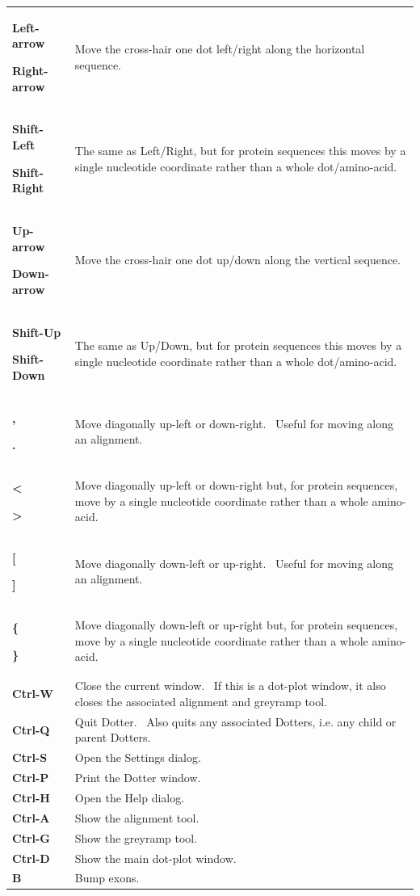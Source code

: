 \documentclass[letterpaper]{article}
\begin{document}
\begin{flushleft}
\tablehead{}
\begin{supertabular}{p{2.222cm}p{11.729cm}}
{\bfseries Left-arrow}

\bfseries Right-arrow &
 Move the cross-hair one dot left/right along
the horizontal sequence.\\
{\bfseries Shift-Left}

\bfseries Shift-Right &
 The same as Left/Right, but for protein
sequences this moves by a single nucleotide coordinate rather than a
whole dot/amino-acid.\\
{\bfseries Up-arrow}

\bfseries Down-arrow &
 Move the cross-hair one dot up/down along the
vertical sequence.\\
{\bfseries Shift-Up}

\bfseries Shift-Down &
 The same as Up/Down, but for protein sequences
this moves by a single nucleotide coordinate rather than a whole
dot/amino-acid.\\
{\bfseries ,}

\bfseries . &
 Move diagonally up-left or down-right. \ Useful
for moving along an alignment.\\
{\bfseries {\textless}}

\bfseries {\textgreater} &
 Move diagonally up-left or down-right but, for
protein sequences, move by a single nucleotide coordinate rather than a
whole amino-acid.\\
{\bfseries [}

\bfseries ] &
 Move diagonally down-left or up-right. \ Useful
for moving along an alignment.\\
{\bfseries \{}

\bfseries \} &
 Move diagonally down-left or up-right but, for
protein sequences, move by a single nucleotide coordinate rather than a
whole amino-acid.\\
\bfseries Ctrl-W &
 Close the current window. \ If this is a
dot-plot window, it also closes the associated alignment and greyramp
tool.\\
\bfseries Ctrl-Q &
 Quit Dotter. \ Also quits any associated
Dotters, i.e. any child or parent Dotters.\\
\bfseries Ctrl-S &
 Open the Settings dialog.\\
\bfseries Ctrl-P &
 Print the Dotter window.\\
\bfseries Ctrl-H &
 Open the Help dialog.\\
\bfseries Ctrl-A &
 Show the alignment tool.\\
\bfseries Ctrl-G &
 Show the greyramp tool.\\
\bfseries Ctrl-D &
 Show the main dot-plot window.\\
\bfseries B &
 Bump exons.\\
\end{supertabular}
\end{flushleft}
\end{document}
